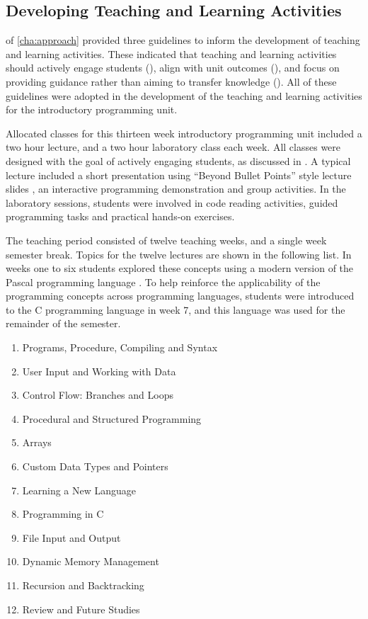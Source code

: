 
\subsection{Developing Teaching and Learning Activities} %
\label{sub:intro_developing_teaching_and_learning_activities}

 of \cref{cha:approach} provided three guidelines to inform the development of teaching and learning activities. These indicated that teaching and learning activities should actively engage students (), align with unit outcomes (), and focus on providing guidance rather than aiming to transfer knowledge (). All of these guidelines were adopted in the development of the teaching and learning activities for the introductory programming unit.

Allocated classes for this thirteen week introductory programming unit included a two hour lecture, and a two hour laboratory class each week. All classes were designed with the goal of actively engaging students, as discussed in . A typical lecture included a short presentation using ``Beyond Bullet Points'' style lecture slides \cite{Atkinson:2007}, an interactive programming demonstration and group activities. In the laboratory sessions, students were involved in code reading activities, guided programming tasks and practical hands-on exercises.

The teaching period consisted of twelve teaching weeks, and a single week semester break. Topics for the twelve lectures are shown in the following list. In weeks one to six students explored these concepts using a modern version of the Pascal programming language \cite{Wirth:1971,FPC:2011}. To help reinforce the applicability of the programming concepts across programming languages, students were introduced to the C programming language \cite{Ritchie:1978} in week 7, and this language was used for the remainder of the semester. 

\begin{enumerate}
  \item Programs, Procedure, Compiling and Syntax
  \item User Input and Working with Data
  \item Control Flow: Branches and Loops
  \item Procedural and Structured Programming
  \item Arrays
  \item Custom Data Types and Pointers
  \item Learning a New Language
  \item Programming in C
  \item File Input and Output
  \item Dynamic Memory Management
  \item Recursion and Backtracking
  \item Review and Future Studies
\end{enumerate}

